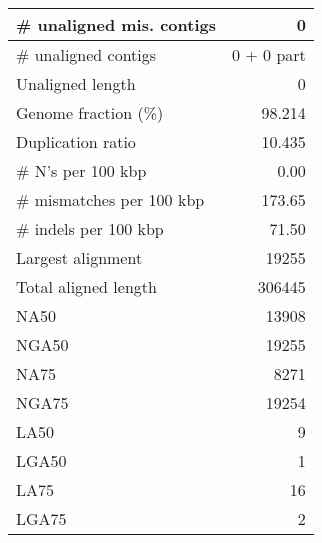 \documentclass[12pt,a4paper]{article}
\begin{document}
\begin{table}[ht]
\begin{center}
\begin{tabular}{|l*{1}{|r}|}
\# unaligned mis. contigs & 0 \\ \hline
\# unaligned contigs & 0 + 0 part \\ \hline
Unaligned length & 0 \\ \hline
Genome fraction (\%) & 98.214 \\ \hline
Duplication ratio & 10.435 \\ \hline
\# N's per 100 kbp & 0.00 \\ \hline
\# mismatches per 100 kbp & 173.65 \\ \hline
\# indels per 100 kbp & 71.50 \\ \hline
Largest alignment & 19255 \\ \hline
Total aligned length & 306445 \\ \hline
NA50 & 13908 \\ \hline
NGA50 & 19255 \\ \hline
NA75 & 8271 \\ \hline
NGA75 & 19254 \\ \hline
LA50 & 9 \\ \hline
LGA50 & 1 \\ \hline
LA75 & 16 \\ \hline
LGA75 & 2 \\ \hline
\end{tabular}
\end{center}
\end{table}
\end{document}
